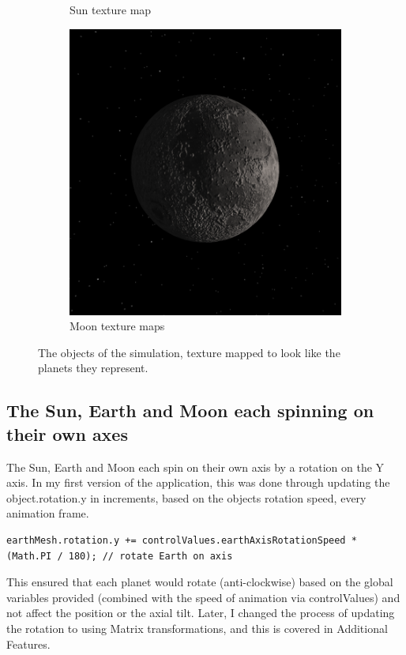 \documentclass[12pt]{article}
\begin{document}
\begin{figure}[H]
\begin{subfigure}[b]{0.4\textwidth}
                \caption{Sun texture map}
                \label{fig: The Sun texture mapped}
       \end{subfigure}
        \begin{subfigure}[b]{0.4\textwidth}
                \includegraphics[width=\textwidth]{images/moontexture}
                \caption{Moon texture maps}
                \label{fig: The Moon texture mapped}
       \end{subfigure}
       \caption{The objects of the simulation, texture mapped to look like the planets they represent.}\label{fig: Texture mapped Sun, Earth and Moon.}
\end{figure}

\subsection{The Sun, Earth and Moon each spinning on their own axes}
The Sun, Earth and Moon each spin on their own axis by a rotation on the Y axis. In my first version of the application, this was done through updating the object.rotation.y in increments, based on the objects rotation speed, every animation frame.
\begin{lstlisting}
earthMesh.rotation.y += controlValues.earthAxisRotationSpeed * (Math.PI / 180); // rotate Earth on axis
\end{lstlisting}
This ensured that each planet would rotate (anti-clockwise) based on the global variables provided (combined with the speed of animation via controlValues) and not affect the position or the axial tilt. Later, I changed the process of updating the rotation to using Matrix transformations, and this is covered in Additional Features.
\end{document}
